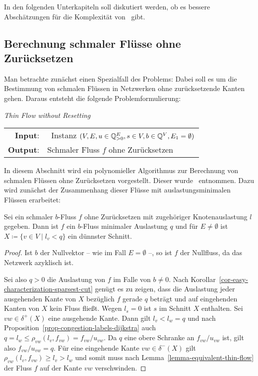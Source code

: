 In den folgenden Unterkapiteln soll diskutiert werden, ob es bessere Abschätzungen für die Komplexität von \probTFwR\ gibt.

\subsection{Berechnung schmaler Flüsse ohne Zurücksetzen}

Man betrachte zunächst einen Spezialfall des Problems:
Dabei soll es um die Bestimmung von schmalen Flüssen in Netzwerken ohne zurücksetzende Kanten gehen.
Daraus entsteht die folgende Problemformulierung:

\begin{center}
	\begin{mdframed}
		\centering
		\emph{Thin Flow without Resetting \probTFwoR} \\[1em]
		\begin{tabular}{rl}
			{\bfseries Input}: &\problemThinFlow\ Instanz $(V, E, u \in \mathbb{Q}^E_{>0}, s\in V, b\in \mathbb{Q}^V, E_1=\emptyset)$\\
			{\bfseries Output}: &Schmaler Fluss $f$ ohne Zurücksetzen
		\end{tabular}
	\end{mdframed}
\end{center}

In diesem Abschnitt wird ein polynomieller Algorithmus zur Berechnung von schmalen Flüssen ohne Zurücksetzen vorgestellt.
Dieser wurde~\cite{Koch2012} entnommen.
Dazu wird zunächst der Zusammenhang dieser Flüsse mit auslastungsminimalen Flüssen erarbeitet:

\begin{lemma}\label{lemma-thin-flows-without-resetting-have-minimal-congestion}
	Sei ein schmaler $b$-Fluss $f$ ohne Zurücksetzen mit zugehöriger Knotenauslastung $l$ gegeben.
	Dann ist $f$ ein $b$-Fluss minimaler Auslastung $q$ und für $E\neq\emptyset$ ist $X\coloneq \{ v\in V \mid l_v < q \}$ ein dünnster Schnitt.
\end{lemma}
\begin{proof}
	Ist $b$ der Nullvektor -- wie im Fall $E=\emptyset$ --, so ist $f$ der Nullfluss, da das Netzwerk azyklisch ist.
	
	Sei also $q>0$ die Auslastung von $f$ im Falle von $b\neq 0$.
	Nach Korollar~\ref{cor-easy-characterization-sparsest-cut} genügt es zu
	zeigen, dass die Auslastung jeder ausgehenden Kante von $X$ bezüglich $f$ gerade $q$ beträgt und auf eingehenden Kanten von $X$ kein Fluss fließt.
	Wegen $l_s=0$ ist $s$ im Schnitt $X$ enthalten.
	Sei $vw\in\delta^+(X)$ eine ausgehende Kante.
	Dann gilt $l_v < l_w = q $ und nach Proposition~\ref{prop-congestion-labels-dijkstra} auch $q = l_w \leq \rho_{vw}(l_v, f_{vw}) = f_{vw} / u_{vw}$.
	Da $q$ eine obere Schranke an $f_{vw}/u_{vw}$ ist, gilt also $f_{vw}/u_{vw} = q$.
	Für eine eingehende Kante $vw\in\delta^-(X)$ gilt $\rho_{vw}(l_v, f_{vw})\geq l_v > l_w$ und somit muss nach Lemma~\ref{lemma-equivalent-thin-flow} der Fluss $f$ auf der Kante $vw$ verschwinden.
\end{proof}

